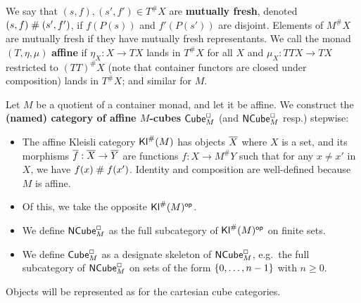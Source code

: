 \documentclass[a4paper]{article}
\begin{document}
We say that $(s, f), (s', f') \in T^\# X$ are \textbf{mutually fresh}, denoted $(s, f) \mathrel{\#} (s', f')$, if $f(P(s))$ and $f'(P(s'))$ are disjoint.
Elements of $M^\# X$ are mutually fresh if they have mutually fresh representants.
We call the monad $(T, \eta, \mu)$ \textbf{affine} if $\eta_X : X \to TX$ lands in $T^\# X$ for all $X$ and $\mu_X : TTX \to TX$ restricted to $(TT)^\# X$ (note that container functors are closed under composition) lands in $T^\# X$; and similar for $M$.

\begin{definition}
Let $M$ be a quotient of a container monad, and let it be affine.
We construct the \textbf{(named) category of affine $M$-cubes ${\mathsf{Cube}}_M^\Box$} (and ${\mathsf{NCube}}_M^\Box$ resp.) stepwise:
\begin{itemize}
	\item The affine Kleisli category ${\mathsf{Kl}}^\#(M)$ has objects ${\overline{X}}$ where $X$ is a set, and its morphisms ${\overline{f}} : {\overline{X}} \to {\overline{Y}}$ are functions $f : X \to M^\#Y$ such that for any $x \neq x'$ in $X$, we have $f(x) \mathrel{\#} f(x')$.
	Identity and composition are well-defined because $M$ is affine.
	\item Of this, we take the opposite ${\mathsf{Kl}}^\#(M)^{\mathsf{op}}$.
	\item We define ${\mathsf{NCube}}_M^\Box$ as the full subcategory of ${\mathsf{Kl}}^\#(M)^{\mathsf{op}}$ on finite sets.
	\item We define ${\mathsf{Cube}}_M^\Box$ as a designate skeleton of ${\mathsf{NCube}}^\Box_M$, e.g.\ the full subcategory of ${\mathsf{NCube}}^\Box_M$ on sets of the form $\mathopen{}\left\{ 0, \ldots, n-1 \right\}\mathclose{}$ with $n \geq 0$.
\end{itemize}
\end{definition}
Objects will be represented as for the cartesian cube categories.
\end{document}
